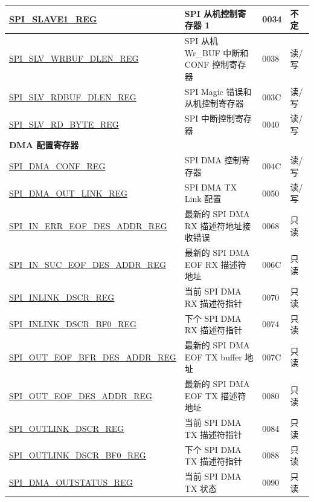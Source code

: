 \begin{longtable}{ | p{6cm} | p{7.2cm} | p{1.3cm} | p{1cm} | }
\hyperref[regdesc:SPISLAVE1REG]{SPI\_SLAVE1\_REG} & SPI 从机控制寄存器 1 & \hexprefix{}0034 & 不定 \\ \hline
\hyperref[regdesc:SPISLVWRBUFDLENREG]{SPI\_SLV\_WRBUF\_DLEN\_REG} & SPI 从机 Wr\_BUF 中断和 CONF 控制寄存器 & \hexprefix{}0038 &读/写 \\ \hline
\hyperref[regdesc:SPISLVRDBUFDLENREG]{SPI\_SLV\_RDBUF\_DLEN\_REG} & SPI Magic 错误和从机控制寄存器 & \hexprefix{}003C &读/写 \\ \hline
\hyperref[regdesc:SPISLVRDBYTEREG]{SPI\_SLV\_RD\_BYTE\_REG} & SPI 中断控制寄存器 & \hexprefix{}0040 &读/写 \\ \hline
\multicolumn{4}{|l|}{\textbf{DMA 配置寄存器}} \\ \hline
\hyperref[regdesc:SPIDMACONFREG]{SPI\_DMA\_CONF\_REG} & SPI DMA 控制寄存器 & \hexprefix{}004C &读/写 \\ \hline
\hyperref[regdesc:SPIDMAOUTLINKREG]{SPI\_DMA\_OUT\_LINK\_REG} & SPI DMA TX Link 配置 & \hexprefix{}0050 &读/写 \\ \hline
\hyperref[regdesc:SPIINERREOFDESADDRREG]{SPI\_IN\_ERR\_EOF\_DES\_ADDR\_REG} & 最新的 SPI DMA RX 描述符地址接收错误 & \hexprefix{}0068 & 只读 \\ \hline
\hyperref[regdesc:SPIINSUCEOFDESADDRREG]{SPI\_IN\_SUC\_EOF\_DES\_ADDR\_REG} & 最新的 SPI DMA EOF RX 描述符地址 & \hexprefix{}006C & 只读 \\ \hline
\hyperref[regdesc:SPIINLINKDSCRREG]{SPI\_INLINK\_DSCR\_REG} & 当前 SPI DMA RX 描述符指针 & \hexprefix{}0070 & 只读 \\ \hline
\hyperref[regdesc:SPIINLINKDSCRBF0REG]{SPI\_INLINK\_DSCR\_BF0\_REG} & 下个 SPI DMA RX 描述符指针 & \hexprefix{}0074 & 只读 \\ \hline
\hyperref[regdesc:SPIOUTEOFBFRDESADDRREG]{SPI\_OUT\_EOF\_BFR\_DES\_ADDR\_REG} & 最新的 SPI DMA EOF TX buffer 地址 & \hexprefix{}007C & 只读 \\ \hline
\hyperref[regdesc:SPIOUTEOFDESADDRREG]{SPI\_OUT\_EOF\_DES\_ADDR\_REG} & 最新的 SPI DMA EOF TX 描述符地址 & \hexprefix{}0080 & 只读 \\ \hline
\hyperref[regdesc:SPIOUTLINKDSCRREG]{SPI\_OUTLINK\_DSCR\_REG} & 当前 SPI DMA TX 描述符指针 & \hexprefix{}0084 & 只读 \\ \hline
\hyperref[regdesc:SPIOUTLINKDSCRBF0REG]{SPI\_OUTLINK\_DSCR\_BF0\_REG} & 下个 SPI DMA TX 描述符指针 & \hexprefix{}0088 & 只读 \\ \hline
\hyperref[regdesc:SPIDMAOUTSTATUSREG]{SPI\_DMA\_OUTSTATUS\_REG} & 当前 SPI DMA TX 状态 & \hexprefix{}0090 & 只读 \\ \hline

\end{longtable}
